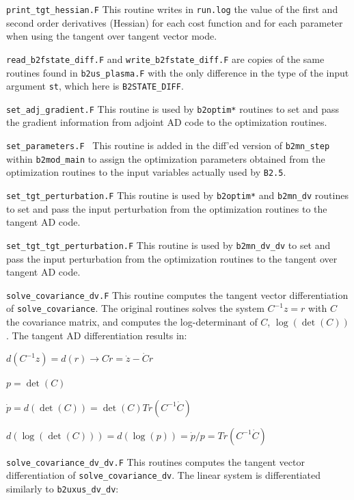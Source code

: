 \begin{description}
  \item {\tt print\_tgt\_hessian.F} This routine writes in {\tt run.log} the value of the first and second order derivatives (Hessian) for each cost function and for each parameter when using the tangent over tangent vector mode.

  \item{\tt read\_b2fstate\_diff.F} and {\tt write\_b2fstate\_diff.F} are copies of the same routines found in {\tt b2us\_plasma.F} with the only difference in the type of the input argument {\tt st}, which here is {\tt B2STATE\_DIFF}.

  \item {\tt set\_adj\_gradient.F} This routine is used by {\tt b2optim*} routines to set and pass the gradient information from adjoint AD code to the optimization routines.

  \item {\tt set\_parameters.F } This routine is added in the diff'ed version of {\tt b2mn\_step} within {\tt b2mod\_main} to assign the optimization parameters obtained from the optimization routines to the input variables actually used by {\tt B2.5}.

  \item {\tt set\_tgt\_perturbation.F} This routine is used by {\tt b2optim*} and {\tt b2mn\_dv} routines to set and pass the input perturbation from the optimization routines to the tangent AD code.

  \item {\tt set\_tgt\_tgt\_perturbation.F} This routine is used by {\tt b2mn\_dv\_dv} to set and pass the input perturbation from the optimization routines to the tangent over tangent AD code.

  \item {\tt solve\_covariance\_dv.F} This routine computes the tangent vector differentiation of {\tt solve\_covariance}. The original routines solves the system $C^{-1}z=r$ with $C$ the covariance matrix, and computes the log-determinant of $C$, $\log(\det(C))$. The tangent AD differentiation results in:

  $d(C^{-1}z)=d(r) \rightarrow C\dot{r}= \dot{z} - \dot{C}r$

  $p=\det(C)$

  $\dot{p} = d(\det(C)) = \det(C)Tr(C^{-1}\dot{C})$

  $d(\log(\det(C)))=d(\log(p)) = \dot{p}/p= Tr(C^{-1}\dot{C})$

  \item {\tt solve\_covariance\_dv\_dv.F} This routines computes the tangent vector differentiation of {\tt solve\_covariance\_dv}. The linear system is differentiated similarly to {\tt b2uxus\_dv\_dv}:


\end{description}
